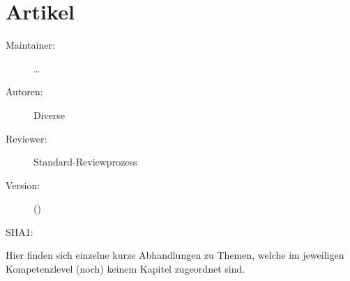\def\ChapterCode{EXPERT}
\chapter
[\CO{[EXPERT]} Artikel]
{Artikel}
\label{chp:EXPERT-Artikel}

\ChapterIntro
{%

}
{%
\begin{description}
  \item[Maintainer:] \ldots
  \item[Autoren:] Diverse
  \item[Reviewer:] Standard-Reviewprozess
  \item[Version:] {\VarDocVersionTypeName} ({\VarDocVersionTypeDescription})
  \item[SHA1:] {\DocGitCommit}
\end{description}

{\TxTeilkapitelAASS}}

{\sffamily\noindent Hier finden sich einzelne kurze
Abhandlungen zu Themen, welche im jeweiligen Kompetenzlevel
(noch) keinem Kapitel zugeordnet sind.}

\clearpage %


\ChapterEnd